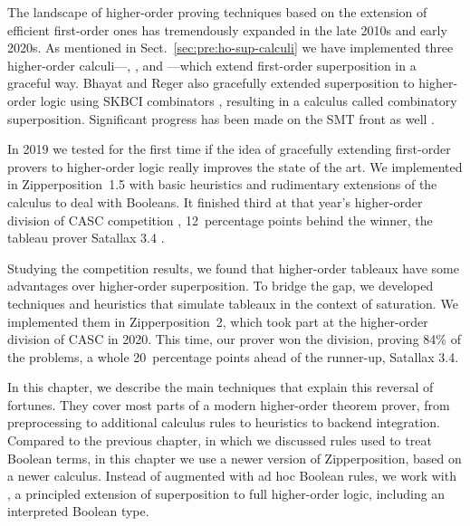 
The landscape of higher-order proving techniques based on the extension of efficient
first-order ones has tremendously expanded in the late 2010s and early 2020s. As
mentioned in Sect.~\ref{sec:pre:ho-sup-calculi} we have implemented three
higher-order calculi---\lfsup{}, \lsup{}, and \osup{}---which extend first-order superposition in a graceful way.
Bhayat and Reger also gracefully extended superposition to higher-order logic using
\textsf{SKBCI} combinators \cite{br-20-full-sup-w-combs}, resulting in a calculus called combinatory superposition. Significant progress has been
made on the SMT front as well \cite{brotb-19-ho-smt}.

In 2019 we tested for the first time if the idea of gracefully extending first-order provers to
higher-order logic really improves the state of the art. We
implemented \lsup{} \cite{bbtvw-21-sup-lam} in Zipperposition~1.5 with basic
heuristics and rudimentary extensions of the calculus to deal with Booleans. It
finished third at that year's higher-order division of CASC competition
\cite{gs-19-casc27}, 12~percentage points behind the winner, the tableau prover
Satallax 3.4 \cite{cb-2013-satallax}.

Studying the competition results, we found that higher-order tableaux have some
advantages over higher-order superposition. To bridge the gap, we developed
techniques and heuristics that simulate tableaux in the context of saturation.
We implemented them in Zipperposition~2, which took part at the higher-order
division of CASC \cite{gs-21-cascj10} in 2020. This time, our prover won the
division, proving 84\% of the problems, a whole 20~percentage points ahead of
the runner-up, Satallax 3.4.

In this chapter, we describe the main techniques that explain this reversal of
fortunes. They cover most parts of a modern higher-order theorem prover, from
preprocessing to additional calculus rules to heuristics to backend integration.
Compared to the previous chapter, in which we discussed rules used to treat
Boolean terms, in this chapter we use a newer version of Zipperposition, based
on a newer calculus. Instead of \lsup{} augmented with ad hoc Boolean rules, we
work with {\osup} \cite{bbtv-21-full-ho-sup}, a principled extension of
superposition to full higher-order logic, including an interpreted Boolean type.

